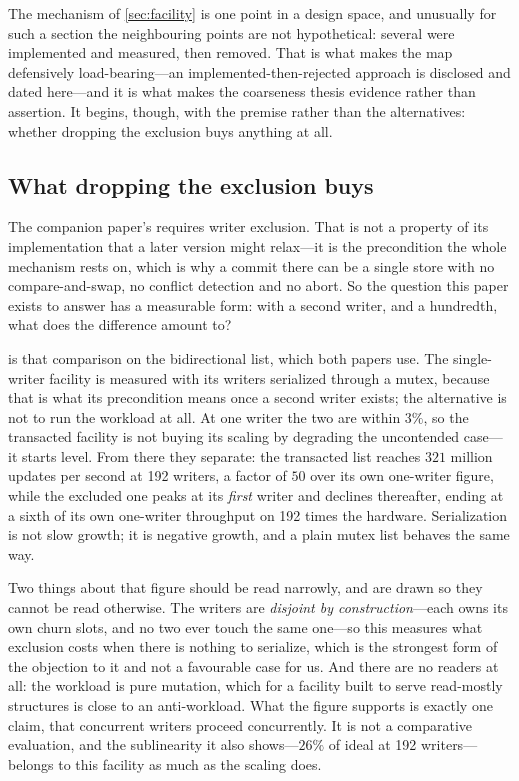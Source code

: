 \documentclass[11pt]{article}
\begin{document}
The mechanism of \cref{sec:facility} is one point in a design space, and unusually
for such a section the neighbouring points are not hypothetical: several were
implemented and measured, then removed. That is what makes the map defensively
load-bearing---an implemented-then-rejected approach is disclosed and dated
here---and it is what makes the coarseness thesis evidence rather than assertion.
It begins, though, with the premise rather than the alternatives: whether
dropping the exclusion buys anything at all.

\subsection{What dropping the exclusion buys}
\label{sec:writerscaling}

The companion paper's \fliplatch requires writer exclusion. That is not a
property of its implementation that a later version might relax---it is the
precondition the whole mechanism rests on, which is why a commit there can be a
single store with no compare-and-swap, no conflict detection and no abort. So the
question this paper exists to answer has a measurable form: with a second writer,
and a hundredth, what does the difference amount to?

 is that comparison on the bidirectional list, which both
papers use. The single-writer facility is measured with its writers serialized
through a mutex, because that is what its precondition means once a second writer
exists; the alternative is not to run the workload at all. At one writer the two
are within $3\%$, so the transacted facility is not buying its scaling by
degrading the uncontended case---it starts level. From there they separate: the
transacted list reaches $321$ million updates per second at 192 writers, a factor
of $50$ over its own one-writer figure, while the excluded one peaks at its
\emph{first} writer and declines thereafter, ending at a sixth of its own
one-writer throughput on 192 times the hardware. Serialization is not slow growth; it is negative growth, and
a plain mutex list behaves the same way.

Two things about that figure should be read narrowly, and are drawn so they
cannot be read otherwise. The writers are \emph{disjoint by construction}---each
owns its own churn slots, and no two ever touch the same one---so this measures
what exclusion costs when there is nothing to serialize, which is the strongest
form of the objection to it and not a favourable case for us. And there are no
readers at all: the workload is pure mutation, which for a facility built to
serve read-mostly structures is close to an anti-workload. What the figure
supports is exactly one claim, that concurrent writers proceed concurrently. It
is not a comparative evaluation, and the sublinearity it also shows---$26\%$ of
ideal at 192 writers---belongs to this facility as much as the scaling does.
\end{document}
